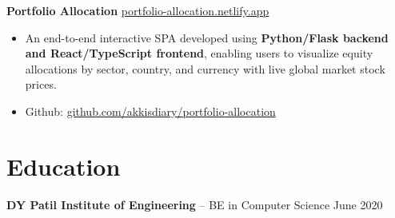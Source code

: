 \documentclass[11pt]{article}       %
\begin{document}
\textbf{Portfolio Allocation} \hfill \href{https://portfolio-allocation.netlify.app/}{\underline{portfolio-allocation.netlify.app}} \\

\begin{itemize}
  \item An end-to-end interactive SPA developed using \textbf{Python/Flask backend and React/TypeScript frontend}, enabling users to visualize equity allocations by sector, country, and currency with live global market stock prices. \\
  \item Github: \href{https://github.com/Akkisdiary/portfolio-allocation}{github.com/akkisdiary/portfolio-allocation} \\
\end{itemize}

\section*{Education}

\textbf{DY Patil Institute of Engineering} -- BE in Computer Science \hfill June 2020 \\
\end{document}
